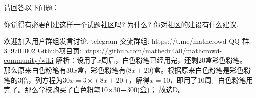 \documentclass[answers]{BHCexam}
\begin{document}
\begin{groups}
\begin{questions}[st]
	\question[30] 请回答以下问题：
	\begin{subquestions}
	\subquestion 你觉得有必要创建这样一个试题社区吗? 为什么?
	\subquestion 你对社区的建设有什么建议.
	\end{subquestions}
				
	\begin{solution}{8cm}
	\methodonly 欢迎加入用户群组发言讨论.
	telegram 交流群组: https://t.me/mathcrowd	
	QQ 群: 319701002
	Github项目页: \url{https://github.com/mathedu4all/mathcrowd-community/wiki}
	解析：设用了\( \displaystyle x\)周后，白色粉笔已经用完，还剩20盒彩色粉笔。那么原来白色粉笔有\( 30x\)盒，彩色粉笔有(\( 8x+20\))盒。根据原来白色粉笔是彩色粉笔的3倍，列方程为\( 30x=3\times (8x+20)\)，解得\( x=10\)，即用了10周，白色粉笔用完了。那么学校购买了白色粉笔10×30＝300(盒)； 故选D。\\
	
									
	\end{solution}

\end{questions}
		
\end{groups}
\end{document}

